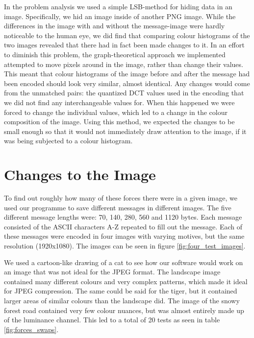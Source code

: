 In the problem analysis we used a simple LSB-method for hiding data in an image.
Specifically, we hid an image inside of another PNG image.
While the differences in the image with and without the message-image were hardly noticeable to the human eye, we did find that comparing colour histograms of the two images revealed that there had in fact been made changes to it.
In an effort to diminish this problem, the graph-theoretical approach we implemented attempted to move pixels around in the image, rather than change their values.
This meant that colour histograms of the image before and after the message had been encoded should look very similar, almost identical.
Any changes would come from the unmatched pairs: the quantized DCT values used in the encoding that we did not find any interchangeable values for.
When this happened we were forced to change the individual values, which led to a change in the colour composition of the image.
Using this method, we expected the changes to be small enough so that it would not immediately draw attention to the image, if it was being subjected to a colour histogram.

\section{Changes to the Image}
\label{sec:changestoimage}
To find out roughly how many of these forces there were in a given image, we used our programme to save different messages in different images.
The five different message lengths were: 70, 140, 280, 560 and 1120 bytes.
Each message consisted of the ASCII characters A-Z repeated to fill out the message.
Each of these messages were encoded in four images with varying motives, but the same resolution (1920x1080).
The images can be seen in figure \ref{fig:four_test_images}.

We used a cartoon-like drawing of a cat to see how our software would work on an image that was not ideal for the JPEG format.
The landscape image contained many different colours and very complex patterns, which made it ideal for JPEG compression.
The same could be said for the tiger, but it contained larger areas of similar colours than the landscape did.
The image of the snowy forest road contained very few colour nuances, but was almost entirely made up of the luminance channel.
This led to a total of 20 tests as seen in table \ref{fig:forces_swaps}.

